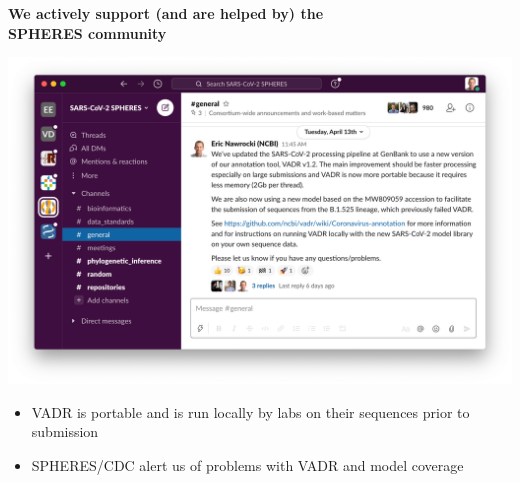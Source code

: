 \documentclass[landscape]{slides}
\begin{document}
\begin{slide}
\begin{center}
\large{\textbf{We actively support (and are helped by) the \\ SPHERES community}}

\includegraphics[width=8in]{figs/spheres-slack-apr132021}

\small
\begin{itemize}
\item VADR is portable and is run locally by labs on their sequences prior to submission
\item SPHERES/CDC alert us of problems with VADR and model coverage
\end{itemize}

\end{center}

\vfill
\end{slide}
%
\end{document}
